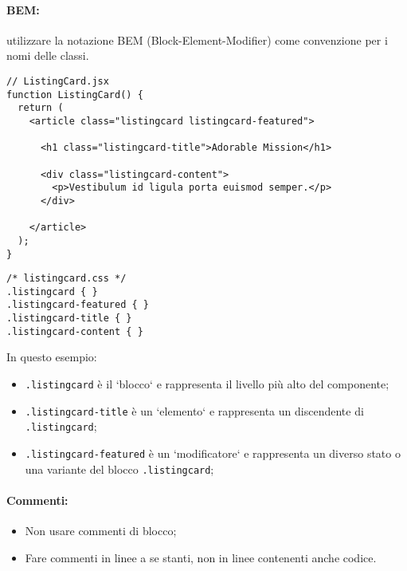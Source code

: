 \documentclass[../ProcessiPrimari.tex]{subfiles}
\begin{document}
\paragraph*{BEM:}
utilizzare la notazione BEM (Block-Element-Modifier) come convenzione per i nomi delle classi.
\begin{center}{
\begin{minipage}{13.5cm}
\begin{Verbatim}[frame=single]
// ListingCard.jsx
function ListingCard() {
  return (
    <article class="listingcard listingcard-featured">

      <h1 class="listingcard-title">Adorable Mission</h1>

      <div class="listingcard-content">
        <p>Vestibulum id ligula porta euismod semper.</p>
      </div>

    </article>
  );
}
\end{Verbatim}
\end{minipage}
}
\end{center}
\begin{center}{
\begin{minipage}{13.5cm}
\begin{Verbatim}[frame=single]
/* listingcard.css */
.listingcard { }
.listingcard-featured { }
.listingcard-title { }
.listingcard-content { }
\end{Verbatim}
\end{minipage}
}
\end{center}
In questo esempio:
\begin{itemize}
	\item \texttt{.listingcard} è il `blocco` e rappresenta il livello più alto del componente;
	\item \texttt{.listingcard-title} è un `elemento` e rappresenta un discendente di \texttt{.listingcard};
	\item \texttt{.listingcard-featured} è un `modificatore` e rappresenta un diverso stato o una variante del blocco \texttt{.listingcard};
\end{itemize}
\paragraph*{Commenti:}
\begin{itemize}
	\item Non usare commenti di blocco;
	\item Fare commenti in linee a se stanti, non in linee contenenti anche codice.
\end{itemize}
\end{document}
